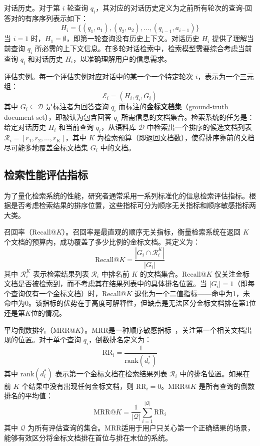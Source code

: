 对话历史。对于第 $i$ 轮查询 $q_i$，其对应的对话历史定义为之前所有轮次的查询-回答对的有序序列表示如下：
\begin{equation}
    H_i = \{(q_1, a_1), (q_2, a_2), \dots, (q_{i-1}, a_{i-1})\}
\end{equation}
当 $i = 1$ 时，$H_1 = \emptyset$，即第一轮查询没有历史上下文。对话历史 $H_i$ 提供了理解当前查询 $q_i$ 所必需的上下文信息。在多轮对话检索中，检索模型需要综合考虑当前查询 $q_i$ 和对话历史 $H_i$，以准确理解用户的信息需求。

评估实例。每一个评估实例对应对话中的某一个一个特定轮次 $i$，表示为一个三元组：
\begin{equation}
    \mathcal{E}_i = (H_i, q_i, G_i)
\end{equation}
其中 $G_i \subseteq \mathcal{D}$ 是标注者为回答查询 $q_i$ 而标注的\textbf{金标文档集}（ground-truth document set），即被认为包含回答 $q_i$ 所需信息的文档集合。检索系统的任务是：给定对话历史 $H_i$ 和当前查询 $q_i$，从语料库 $\mathcal{D}$ 中检索出一个排序的候选文档列表 $\mathcal{R}_i = [r_1, r_2, \dots, r_K]$，其中 $K$ 为检索预算（即返回文档数），使得排序靠前的文档尽可能多地覆盖金标文档集 $G_i$ 中的文档。

\subsection{检索性能评估指标}

为了量化检索系统的性能，研究者通常采用一系列标准化的信息检索评估指标。根据是否考虑检索结果的排序位置，这些指标可分为顺序无关指标和顺序敏感指标两大类。

召回率（Recall@$K$）。召回率是最直观的顺序无关指标，衡量检索系统在返回 $K$ 个文档的预算内，成功覆盖了多少比例的金标文档。其定义为：
\begin{equation}
    \text{Recall@}K = \frac{|G_i \cap \mathcal{R}_i^K|}{|G_i|}
\end{equation}
其中 $\mathcal{R}_i^K$ 表示检索结果列表 $\mathcal{R}_i$ 中排名前 $K$ 的文档集合。Recall@$K$ 仅关注金标文档是否被检索到，而不考虑其在结果列表中的具体排名位置。当 $|G_i| = 1$（即每个查询仅有一个金标文档）时，Recall@$K$ 退化为一个二值指标——命中为1，未命中为0。该指标的优势在于高度可解释性，但缺点是无法区分金标文档排在第1位还是第$K$位的情况。

平均倒数排名（MRR@$K$）。MRR是一种顺序敏感指标~\citep{voorhees1999trec}，关注第一个相关文档出现的位置。对于单个查询 $q_i$，倒数排名定义为：
\begin{equation}
    \text{RR}_i = \frac{1}{\text{rank}(d^*_i)}
\end{equation}
其中 $\text{rank}(d^*_i)$ 表示第一个金标文档在检索结果列表 $\mathcal{R}_i$ 中的排名位置。如果在前 $K$ 个结果中没有出现任何金标文档，则 $\text{RR}_i = 0$。MRR@$K$ 是所有查询的倒数排名的平均值：
\begin{equation}
    \text{MRR@}K = \frac{1}{|\mathcal{Q}|} \sum_{i=1}^{|\mathcal{Q}|} \text{RR}_i
\end{equation}
其中 $\mathcal{Q}$ 为所有评估查询的集合。MRR适用于用户只关心第一个正确结果的场景，能够有效区分将金标文档排在首位与排在末位的系统。

